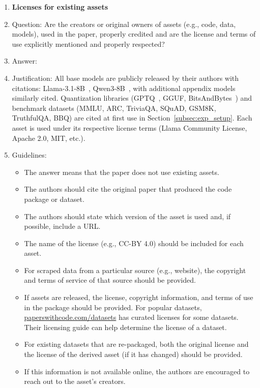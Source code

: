 \begin{enumerate}
\item {\bf Licenses for existing assets}
    \item[] Question: Are the creators or original owners of assets (e.g., code, data, models), used in the paper, properly credited and are the license and terms of use explicitly mentioned and properly respected?
    \item[] Answer: \answerYes{}
    \item[] Justification: All base models are publicly released by their authors with citations: Llama-3.1-8B~\cite{grattafiori2024llama}, Qwen3-8B~\cite{qwen2025qwen3}, with additional appendix models similarly cited. Quantization libraries (GPTQ~\cite{frantar2022gptq}, GGUF, BitsAndBytes~\cite{dettmers2022gpt3}) and benchmark datasets (MMLU, ARC, TriviaQA, SQuAD, GSM8K, TruthfulQA, BBQ) are cited at first use in Section~\ref{subsec:exp_setup}. Each asset is used under its respective license terms (Llama Community License, Apache 2.0, MIT, etc.).
    \item[] Guidelines:
    \begin{itemize}
        \item The answer \answerNA{} means that the paper does not use existing assets.
        \item The authors should cite the original paper that produced the code package or dataset.
        \item The authors should state which version of the asset is used and, if possible, include a URL.
        \item The name of the license (e.g., CC-BY 4.0) should be included for each asset.
        \item For scraped data from a particular source (e.g., website), the copyright and terms of service of that source should be provided.
        \item If assets are released, the license, copyright information, and terms of use in the package should be provided. For popular datasets, \url{paperswithcode.com/datasets} has curated licenses for some datasets. Their licensing guide can help determine the license of a dataset.
        \item For existing datasets that are re-packaged, both the original license and the license of the derived asset (if it has changed) should be provided.
        \item If this information is not available online, the authors are encouraged to reach out to the asset's creators.
    \end{itemize}


\end{enumerate}
